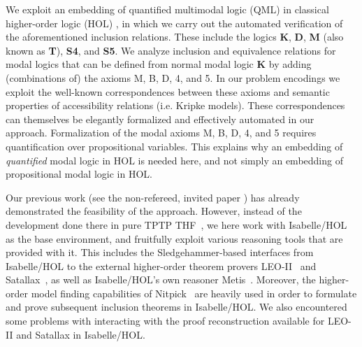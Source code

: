 \begin{isabellebody}
\begin{isamarkuptext}
We exploit an embedding of quantified multimodal
logic (QML) in classical higher-order logic (HOL) \cite{J23}, in which we carry out the
automated verification of the aforementioned inclusion relations. These include the logics \textbf{K}, \textbf{D},
\textbf{M} (also known as \textbf{T}), \textbf{S4}, and
\textbf{S5}. We analyze inclusion and equivalence
relations for modal logics that can be defined from normal modal logic
\textbf{K} by adding (combinations of) the axioms M, B, D, 4, and
5. In our problem encodings we exploit the well-known correspondences
between these axioms and semantic properties of accessibility
relations (i.e. Kripke models). These correspondences can themselves be elegantly formalized
and effectively automated in our approach. Formalization of the modal
axioms M, B, D, 4, and 5 requires quantification over propositional
variables. This explains why an embedding of \textit{quantified} modal
logic in HOL is needed here, and not simply an embedding of propositional
modal logic in HOL.


Our previous work (see the non-refereed, invited paper \cite{B12}) has
already demonstrated the feasibility of the approach. However, instead
of the development done there in pure TPTP THF~\cite{C25},
we here work with Isabelle/HOL~\cite{Nipkow-Paulson-Wenzel:2002} as the base
environment, and fruitfully exploit various reasoning
tools that are provided with it. This includes the
Sledgehammer-based \cite{EasyChair:128} interfaces from Isabelle/HOL to
the external higher-order theorem provers LEO-II~\cite{C26} and
Satallax~\cite{Satallax}, as well as Isabelle/HOL's own reasoner
Metis~\cite{hurd2003d}. Moreover, the higher-order model finding capabilities
of Nitpick~\cite{BlanchetteN-ITP10} are heavily used in order to formulate
and prove subsequent inclusion theorems in Isabelle/HOL.
We also encountered some problems with interacting with the proof
reconstruction available for LEO-II and Satallax in Isabelle/HOL.


\end{isamarkuptext}
\end{isabellebody}
